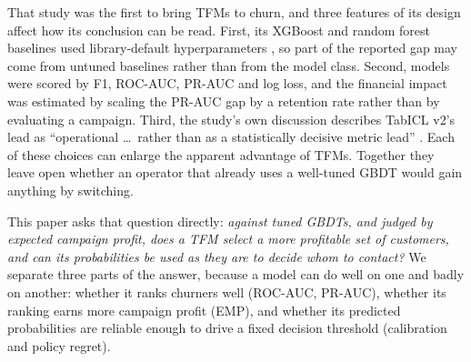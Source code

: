 \documentclass[11pt]{article}
\newcommand{\tfm}{TFM\xspace}
\newcommand{\tfms}{TFMs\xspace}
\begin{document}
That study was the first to bring \tfms to churn, and three features of its design affect how its conclusion can be
read. First, its XGBoost and random forest baselines used library-default hyperparameters
\cite[Section~3.2]{seyedzadeh2026churn}, so part of the reported gap may come from untuned baselines rather than from the
model class. Second, models were scored by F1, ROC-AUC, PR-AUC and log loss, and the financial impact was estimated by
scaling the PR-AUC gap by a retention rate rather than by evaluating a campaign. Third, the study's own discussion
describes TabICL v2's lead as ``operational \ldots\ rather than as a statistically decisive metric lead''
\cite[Section~4.2]{seyedzadeh2026churn}. Each of these choices can enlarge the apparent advantage of \tfms. Together
they leave open whether an operator that already uses a well-tuned GBDT would gain anything by switching.

This paper asks that question directly: \emph{against tuned GBDTs, and judged by expected campaign profit, does a
\tfm select a more profitable set of customers, and can its probabilities be used as they are to decide whom to
contact?} We separate three parts of the answer, because a model can do well on one and badly on another: whether it
ranks churners well (ROC-AUC, PR-AUC), whether its ranking earns more campaign profit (EMP), and whether its predicted
probabilities are reliable enough to drive a fixed decision threshold (calibration and policy regret).
\end{document}
